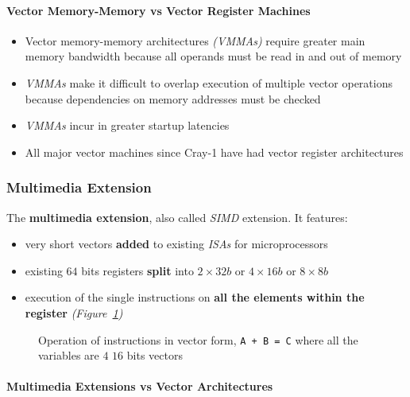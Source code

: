 \documentclass[english]{article}
\begin{document}
\paragraph{Vector Memory-Memory vs Vector Register Machines}

\begin{itemize}
  \item Vector memory-memory architectures \textit{(VMMAs)} require greater main memory bandwidth because all operands must be read in and out of memory
  \item \textit{VMMAs} make it difficult to overlap execution of multiple vector operations because dependencies on memory addresses must be checked
  \item \textit{VMMAs} incur in greater startup latencies
  \item All major vector machines since Cray-1 have had vector register architectures
\end{itemize}

\subsubsection{Multimedia Extension}

The \textbf{multimedia extension}, also called \textit{SIMD} extension. It features:

\begin{itemize}
  \item very short vectors \textbf{added} to existing \textit{ISAs} for microprocessors
  \item existing \(64\) bits registers \textbf{split} into \(2 \times 32 b\) or \(4 \times 16 b\) or \(8 \times 8 b\)
  \item execution of the single instructions on \textbf{all the elements within the register} \textit{(Figure~\ref{fig:operations-in-vector-form})}
\end{itemize}

\begin{figure}[htbp]
  \bigskip
  \centering
  \caption{Operation of instructions in vector form, \texttt{A + B = C} where all the variables are \(4\) \(16\) bits vectors}
  \label{fig:operations-in-vector-form}
  \bigskip
\end{figure}

\paragraph{Multimedia Extensions vs Vector Architectures}
\end{document}
